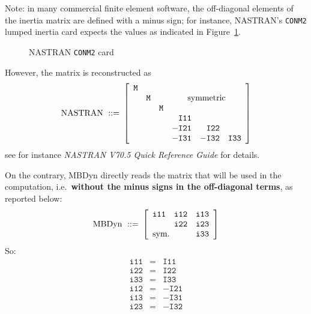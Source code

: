 Note: in many commercial finite element software, the off-diagonal elements 
of the inertia matrix are defined with a minus sign; for instance, 
NASTRAN's \texttt{CONM2} lumped inertia card expects the values as indicated
in Figure~\ref{fig:el:body:CONM2}.
%
\begin{figure}[b]
\centering
\begin{minipage}{120mm}
\end{minipage}
\caption{NASTRAN \texttt{CONM2} card}
\label{fig:el:body:CONM2}
\end{figure}
%
However, the matrix is reconstructed as
\begin{displaymath}
	\mathrm{NASTRAN \ ::= } \ \sqbr{\matr{rrrrrr}{
		\texttt{M} & & & & & \\
		& \texttt{M} & & \multicolumn{3}{c}{\text{symmetric}} \\
		& & \texttt{M} & & & \\
		& & & \texttt{I11} & & \\
		& & & -\texttt{I21} & \texttt{I22} & \\
		& & & -\texttt{I31} & -\texttt{I32} & \texttt{I33}
	}}
\end{displaymath}
see for instance \emph{NASTRAN V70.5 Quick Reference Guide} for details.

\noindent
On the contrary, MBDyn directly reads the matrix 
that will be used in the computation, i.e.\ 
\textbf{without the minus signs in the off-diagonal terms},
as reported below:
\begin{displaymath}
	\mathrm{MBDyn \ ::= } \ \sqbr{\matr{ccc}{
		\texttt{i11} & \texttt{i12} & \texttt{i13} \\
		& \texttt{i22} & \texttt{i23} \\
		\multicolumn{2}{l}{\text{sym.}} & \texttt{i33}
	}}
\end{displaymath}
So:
\begin{eqnarray*}
	\texttt{i11} & = & \texttt{I11} \\
	\texttt{i22} & = & \texttt{I22} \\
	\texttt{i33} & = & \texttt{I33} \\
	\texttt{i12} & = & - \texttt{I21} \\
	\texttt{i13} & = & - \texttt{I31} \\
	\texttt{i23} & = & - \texttt{I32}
\end{eqnarray*}


